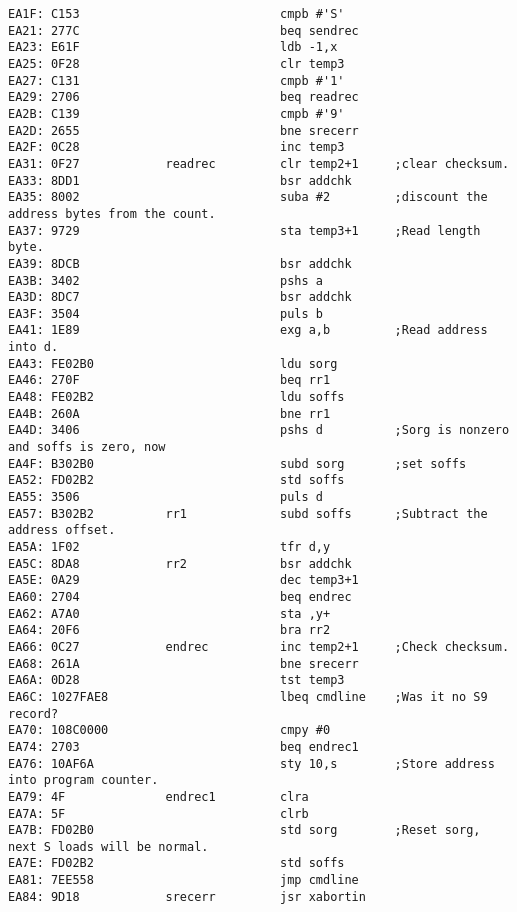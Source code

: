 {\begin{verbatim}
EA1F: C153                            cmpb #'S'
EA21: 277C                            beq sendrec
EA23: E61F                            ldb -1,x
EA25: 0F28                            clr temp3
EA27: C131                            cmpb #'1'
EA29: 2706                            beq readrec
EA2B: C139                            cmpb #'9'
EA2D: 2655                            bne srecerr
EA2F: 0C28                            inc temp3               
EA31: 0F27            readrec         clr temp2+1     ;clear checksum.
EA33: 8DD1                            bsr addchk
EA35: 8002                            suba #2         ;discount the address bytes from the count.
EA37: 9729                            sta temp3+1     ;Read length byte.
EA39: 8DCB                            bsr addchk
EA3B: 3402                            pshs a
EA3D: 8DC7                            bsr addchk
EA3F: 3504                            puls b
EA41: 1E89                            exg a,b         ;Read address into d.
EA43: FE02B0                          ldu sorg
EA46: 270F                            beq rr1         
EA48: FE02B2                          ldu soffs
EA4B: 260A                            bne rr1
EA4D: 3406                            pshs d          ;Sorg is nonzero and soffs is zero, now
EA4F: B302B0                          subd sorg       ;set soffs
EA52: FD02B2                          std soffs
EA55: 3506                            puls d
EA57: B302B2          rr1             subd soffs      ;Subtract the address offset.
EA5A: 1F02                            tfr d,y
EA5C: 8DA8            rr2             bsr addchk      
EA5E: 0A29                            dec temp3+1
EA60: 2704                            beq endrec
EA62: A7A0                            sta ,y+
EA64: 20F6                            bra rr2
EA66: 0C27            endrec          inc temp2+1     ;Check checksum.
EA68: 261A                            bne srecerr
EA6A: 0D28                            tst temp3
EA6C: 1027FAE8                        lbeq cmdline    ;Was it no S9 record?
EA70: 108C0000                        cmpy #0
EA74: 2703                            beq endrec1 
EA76: 10AF6A                          sty 10,s        ;Store address into program counter.
EA79: 4F              endrec1         clra
EA7A: 5F                              clrb
EA7B: FD02B0                          std sorg        ;Reset sorg, next S loads will be normal.
EA7E: FD02B2                          std soffs
EA81: 7EE558                          jmp cmdline     
EA84: 9D18            srecerr         jsr xabortin

\end{verbatim}}
